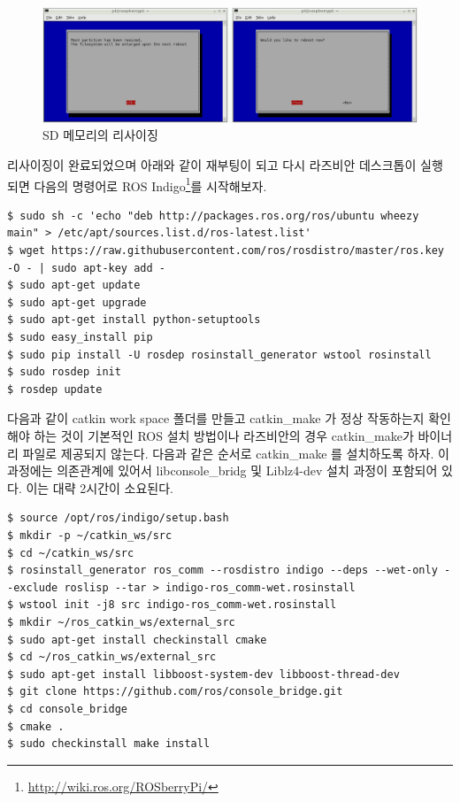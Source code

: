 \begin{figure}[h]
\centering\includegraphics[width=\columnwidth]{pictures/chapter3/raspberrypi_expand_filesystem2.png}
\caption{SD 메모리의 리사이징}
\label{fig:raspberrypi_expand_filesystem2}
\end{figure}

리사이징이 완료되었으며 아래와 같이 재부팅이 되고 다시 라즈비안 데스크톱이 실행되면 다음의 명령어로 ROS Indigo\footnote{\url{http://wiki.ros.org/ROSberryPi/}}를 시작해보자.

\vspace{\baselineskip}
\begin{lstlisting}[language=ROS]
$ sudo sh -c 'echo "deb http://packages.ros.org/ros/ubuntu wheezy main" > /etc/apt/sources.list.d/ros-latest.list'
$ wget https://raw.githubusercontent.com/ros/rosdistro/master/ros.key -O - | sudo apt-key add -
$ sudo apt-get update
$ sudo apt-get upgrade
$ sudo apt-get install python-setuptools
$ sudo easy_install pip
$ sudo pip install -U rosdep rosinstall_generator wstool rosinstall
$ sudo rosdep init
$ rosdep update
\end{lstlisting}

다음과 같이 catkin work space 폴더를 만들고 catkin\_make 가 정상 작동하는지 확인해야 하는 것이 기본적인 ROS 설치 방법이나 라즈비안의 경우 catkin\_make가 바이너리 파일로 제공되지 않는다. 다음과 같은 순서로 catkin\_make 를 설치하도록 하자. 이 과정에는 의존관계에 있어서 libconsole\_bridg 및 Liblz4-dev 설치 과정이 포함되어 있다. 이는 대략 2시간이 소요된다.

\vspace{\baselineskip}
\vspace{\baselineskip}
\begin{lstlisting}[language=ROS]
$ source /opt/ros/indigo/setup.bash
$ mkdir -p ~/catkin_ws/src
$ cd ~/catkin_ws/src
$ rosinstall_generator ros_comm --rosdistro indigo --deps --wet-only --exclude roslisp --tar > indigo-ros_comm-wet.rosinstall
$ wstool init -j8 src indigo-ros_comm-wet.rosinstall
$ mkdir ~/ros_catkin_ws/external_src
$ sudo apt-get install checkinstall cmake
$ cd ~/ros_catkin_ws/external_src
$ sudo apt-get install libboost-system-dev libboost-thread-dev
$ git clone https://github.com/ros/console_bridge.git
$ cd console_bridge
$ cmake .
$ sudo checkinstall make install
\end{lstlisting}

